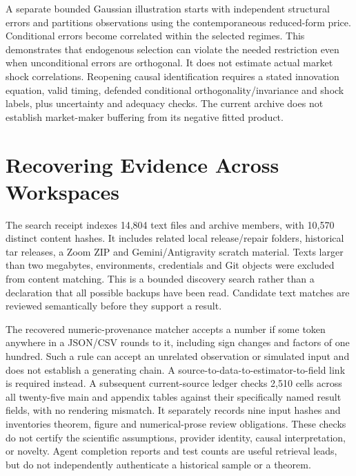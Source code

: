 A separate bounded Gaussian illustration starts with independent structural errors and partitions observations using the contemporaneous reduced-form price. Conditional errors become correlated within the selected regimes. This demonstrates that endogenous selection can violate the needed restriction even when unconditional errors are orthogonal. It does not estimate actual market shock correlations. Reopening causal identification requires a stated innovation equation, valid timing, defended conditional orthogonality/invariance and shock labels, plus uncertainty and adequacy checks. The current archive does not establish market-maker buffering from its negative fitted product.
\section{Recovering Evidence Across Workspaces}
The search receipt indexes 14,804 text files and archive members, with 10,570 distinct content hashes. It includes related local release/repair folders, historical tar releases, a Zoom ZIP and Gemini/Antigravity scratch material. Texts larger than two megabytes, environments, credentials and Git objects were excluded from content matching. This is a bounded discovery search rather than a declaration that all possible backups have been read. Candidate text matches are reviewed semantically before they support a result.

The recovered numeric-provenance matcher accepts a number if some token anywhere in a JSON/CSV rounds to it, including sign changes and factors of one hundred. Such a rule can accept an unrelated observation or simulated input and does not establish a generating chain. A source-to-data-to-estimator-to-field link is required instead. A subsequent current-source ledger checks 2,510 cells across all twenty-five main and appendix tables against their specifically named result fields, with no rendering mismatch. It separately records nine input hashes and inventories theorem, figure and numerical-prose review obligations. These checks do not certify the scientific assumptions, provider identity, causal interpretation, or novelty. Agent completion reports and test counts are useful retrieval leads, but do not independently authenticate a historical sample or a theorem.

